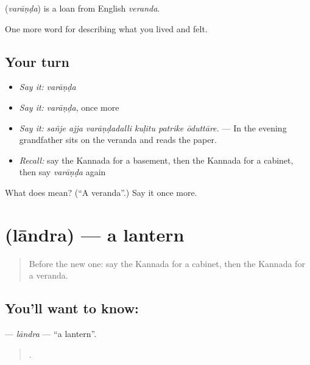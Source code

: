 \begin{cousinweb}
\textbf{} (\emph{varāṇḍa}) is a loan from English \emph{veranda}.
\end{cousinweb}

\begin{grammarlens}[title={What you've built}]
One more word for describing what you lived and felt.
\end{grammarlens}

\subsection*{Your turn}
\begin{itemize}
\raggedright
  \item \emph{Say it:} \emph{varāṇḍa}
  \item \emph{Say it:} \emph{varāṇḍa}, once more
  \item \emph{Say it:} \emph{sañje ajja varāṇḍadalli kuḷitu patrike ōduttāre.} — In the evening grandfather sits on the veranda and reads the paper.
  \item \emph{Recall:} say the Kannada for a basement, then the Kannada for a cabinet, then say \emph{varāṇḍa} again
\end{itemize}

\begin{tcolorbox}[breakable,colback=teal!4,colframe=teal!35!black,title={Before you move on}]
What does  mean? (\textquotedblleft{}A veranda\textquotedblright{}.) Say it once more.
\end{tcolorbox}
\section[\texorpdfstring{\kn{ಲಾಂದ್ರ} (lāndra)}{ಲಾಂದ್ರ (lāndra)}]{ (lāndra) — a lantern}

\label{lesson:KA-C543-landra}



\begin{quote}
Before the new one: say the Kannada for a cabinet, then the Kannada for a veranda.
\end{quote}

\subsection*{You'll want to know: }
\textbf{} — \emph{lāndra} — \textquotedblleft{}a lantern\textquotedblright{}.

\begin{quote}
    .
\end{quote}

